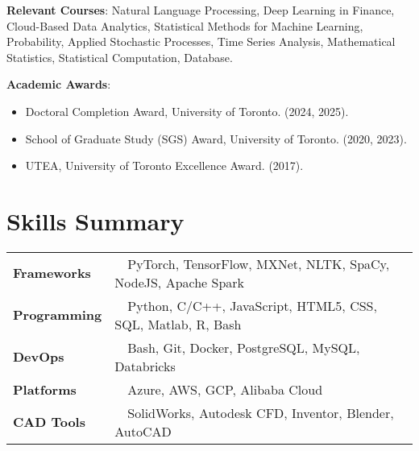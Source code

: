 \documentclass[a4paper,20pt]{article}
\begin{document}
\vspace{2pt}

{\textbf{Relevant Courses}: Natural Language Processing, Deep Learning in Finance, Cloud-Based Data Analytics, Statistical Methods for Machine Learning, Probability, Applied Stochastic Processes, Time Series Analysis, Mathematical Statistics, Statistical Computation, Database.
}

\vspace{2pt}

{\textbf{Academic Awards}: 
{\begin{itemize}
  \vspace{-8pt}
  \item Doctoral Completion Award, University of Toronto. (2024, 2025). \vspace{-8pt}
  \item School of Graduate Study (SGS) Award, University of Toronto. (2020, 2023). \vspace{-8pt}
  \item UTEA, University of Toronto Excellence Award. (2017). \vspace{-8pt}
  \end{itemize}
  }
}





\vspace{-1pt}
\section{Skills Summary}

\begin{tabular}{@{}ll}
\textbf{Frameworks}    & ~~PyTorch, TensorFlow, MXNet, NLTK, SpaCy, NodeJS, Apache Spark  \\
\textbf{Programming}   & ~~Python, C/C++, JavaScript, HTML5, CSS, SQL, Matlab, R, Bash    \\
\textbf{DevOps}        & ~~Bash, Git, Docker, PostgreSQL, MySQL, Databricks               \\
\textbf{Platforms}     & ~~Azure, AWS, GCP, Alibaba Cloud                                 \\
\textbf{CAD Tools}     & ~~SolidWorks, Autodesk CFD, Inventor, Blender, AutoCAD           \\
\end{tabular}
\end{document}
